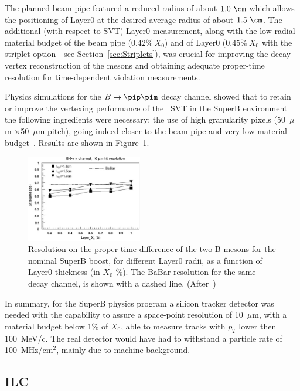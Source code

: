 The planned beam pipe featured a reduced radius of about $1.0~\cm$  which allows the positioning of 
Layer0 at
the desired average radius of about $1.5~\cm$. The additional  (with respect to \babar SVT) 
 Layer0 measurement,
along with the low radial material budget of the beam pipe ($0.42\%~X_0$)
and of Layer0 ($0.45\%~X_0$ with the striplet option - see Section~\ref{sec:Striplets}),
was crucial for improving the decay vertex reconstruction of the \B mesons and
 obtaining adequate proper-time resolution for time-dependent \CP violation measurements.

Physics simulations for the $B\to\pip\pim$ decay channel showed that to retain or improve the vertexing performance of the \babar\ SVT in the SuperB environment the following ingredients were necessary: the use of high granularity pixels (50~$\mu$m $\times$50~$\mu$m pitch), going indeed closer to the beam pipe and very low material budget~\cite{RIZZO2010585}. Results are shown in 
Figure~\ref{fig:bpipi}. 

\begin{figure}
\centering
\includegraphics[width=0.45\textwidth]{bpipi}
\caption{\label{fig:bpipi} Resolution on the proper time difference of the two B mesons for the nominal SuperB boost, for different Layer0 radii, as a function of Layer0 thickness (in $X_0$ \%). The BaBar resolution for the same decay channel, is shown with a dashed line. (After~\cite{RIZZO2010585})}
\end{figure}

In summary, for the SuperB physics program a silicon tracker detector was needed with the 
capability to assure a space-point resolution of 10~$\mu$m, with a material budget below 
1\% of $X_0$, able to measure tracks with $p_T$ lower then 100~MeV/c. The real detector 
would have had to withstand a particle rate of 100~MHz/cm$^2$, mainly due to machine 
background.

\subsection{ILC}

